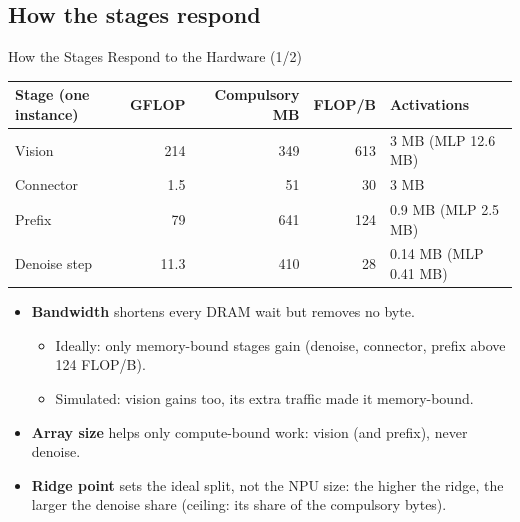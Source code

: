 \documentclass[light]{theme-beamer}
\begin{document}
\subsection{How the stages respond}
\begin{frame}{How the Stages Respond to the Hardware (1/2)}
    \begin{center}
    \small
    \begin{tabular}{l r r r l}
        \toprule
        Stage (one instance) & GFLOP & Compulsory MB & FLOP/B & Activations \\
        \midrule
        Vision & 214 & 349 & 613 & 3 MB (MLP 12.6 MB) \\
        Connector & 1.5 & 51 & 30 & 3 MB \\
        Prefix & 79 & 641 & 124 & 0.9 MB (MLP 2.5 MB) \\
        Denoise step & 11.3 & 410 & 28 & 0.14 MB (MLP 0.41 MB) \\
        \bottomrule
    \end{tabular}
    \end{center}
    \begin{itemize}
        \item \textbf{Bandwidth} shortens every DRAM wait but removes no byte.
        \begin{itemize}
            \item Ideally: only memory-bound stages gain (denoise, connector, prefix above 124 FLOP/B).
            \item Simulated: vision gains too, its extra traffic made it memory-bound.
        \end{itemize}
        \item \textbf{Array size} helps only compute-bound work: vision (and prefix), never denoise.
        \item \textbf{Ridge point} sets the ideal split, not the NPU size: the higher the ridge, the larger the denoise share (ceiling: its share of the compulsory bytes).
    \end{itemize}
\end{frame}
\end{document}
